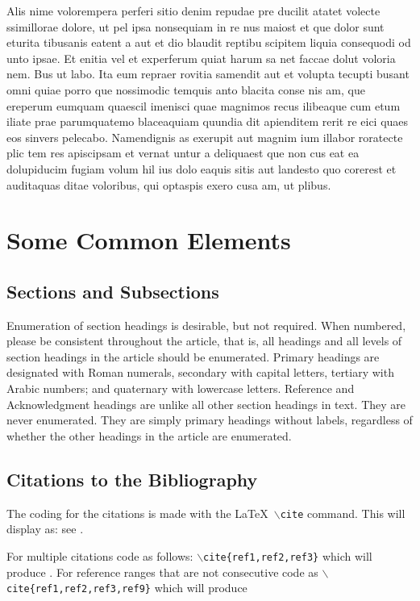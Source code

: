 \documentclass[lettersize,journal]{IEEEtran}
\begin{document}
Alis nime volorempera perferi sitio denim repudae pre ducilit atatet volecte ssimillorae dolore, ut pel ipsa nonsequiam in re nus maiost et que dolor sunt eturita tibusanis eatent a aut et dio blaudit reptibu scipitem liquia consequodi od unto ipsae. Et enitia vel et experferum quiat harum sa net faccae dolut voloria nem. Bus ut labo. Ita eum repraer rovitia samendit aut et volupta tecupti busant omni quiae porro que nossimodic temquis anto blacita conse nis am, que ereperum eumquam quaescil imenisci quae magnimos recus ilibeaque cum etum iliate prae parumquatemo blaceaquiam quundia dit apienditem rerit re eici quaes eos sinvers pelecabo. Namendignis as exerupit aut magnim ium illabor roratecte plic tem res apiscipsam et vernat untur a deliquaest que non cus eat ea dolupiducim fugiam volum hil ius dolo eaquis sitis aut landesto quo corerest et auditaquas ditae voloribus, qui optaspis exero cusa am, ut plibus.


\section{Some Common Elements}
\subsection{Sections and Subsections}
Enumeration of section headings is desirable, but not required. When numbered, please be consistent throughout the article, that is, all headings and all levels of section headings in the article should be enumerated. Primary headings are designated with Roman numerals, secondary with capital letters, tertiary with Arabic numbers; and quaternary with lowercase letters. Reference and Acknowledgment headings are unlike all other section headings in text. They are never enumerated. They are simply primary headings without labels, regardless of whether the other headings in the article are enumerated. 

\subsection{Citations to the Bibliography}
The coding for the citations is made with the \LaTeX\ $\backslash${\tt{cite}} command. 
This will display as: see \cite{ref1}.

For multiple citations code as follows: {\tt{$\backslash$cite\{ref1,ref2,ref3\}}}
 which will produce \cite{ref1,ref2,ref3}. For reference ranges that are not consecutive code as {\tt{$\backslash$cite\{ref1,ref2,ref3,ref9\}}} which will produce  \cite{ref1,ref2,ref3,ref9}
\end{document}
